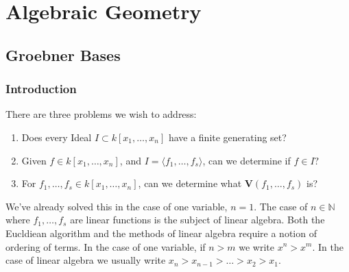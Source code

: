 \documentclass[crop=false,class=article,oneside]{standalone}
\begin{document}
    \ifx\ifmathcoursesalgebraicgeometry\undefined
        \section*{Algebraic Geometry}
        \setcounter{section}{1}
    \fi
    \subsection{Groebner Bases}
        \subsubsection{Introduction}
            There are three problems we wish to address:
            \begin{enumerate}
                \item Does every Ideal
                      $I\subset k[x_1,\hdots ,x_n]$
                      have a finite generating set?
                \item Given $f\in k[x_1,\hdots ,x_n]$,
                      and $I=\langle f_1,\hdots, f_s\rangle$,
                      can we determine if $f\in I?$
                \item For $f_1,\hdots,f_{s}\in{k}[x_{1},\hdots,x_{n}]$,
                      can we determine what
                      $\mathbf{V}(f_1,\hdots, f_s)$ is?
            \end{enumerate}
            We've already solved this in the case of one
            variable, $n=1$. The case of $n\in\mathbb{N}$
            where $f_1,\hdots,f_s$ are linear functions is the
            subject of linear algebra. Both the Eucldiean
            algorithm and the methods of linear algebra require
            a notion of ordering of terms. In the case of one
            variable, if $n>m$ we write $x^n>x^m$. In the case of
            linear algebra we usually write
            $x_n>x_{n-1}>\hdots>x_{2}>x_{1}$. 
\end{document}
